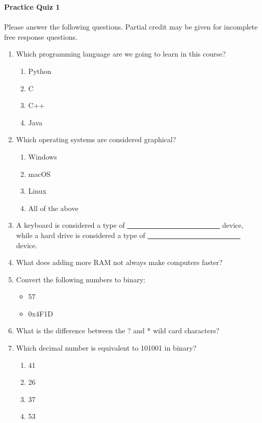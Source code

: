 \documentclass[letter,11pt]{article}
\begin{document}
\huge
\textbf{Practice Quiz 1}
\normalsize

\paragraph{}Please answer the following questions. Partial credit may be given for incomplete free response questions.

\begin{enumerate}
    \item Which programming language are we going to learn in this course?
    \begin{enumerate}
        \item Python
        \item C
        \item C++
        \item Java
    \end{enumerate}
    
    \item Which operating systems are considered graphical?
    \begin{enumerate}
        \item Windows
        \item macOS
        \item Linux
        \item All of the above
    \end{enumerate}
    
    \item A keyboard is considered a type of \underline{~~ ~~ ~~ ~~ ~~ ~~ ~~ ~~ ~~ ~~} device, while a hard drive is considered a type of \underline{~~ ~~ ~~ ~~ ~~ ~~ ~~ ~~ ~~ ~~} device.
    
    \item What does adding more RAM not always make computers faster?
    
    \item Convert the following numbers to binary:
    \begin{itemize}
        \item 57
        \item 0x4F1D
    \end{itemize}
    
    \item What is the difference between the ? and * wild card characters?
    
    \item Which decimal number is equivalent to 101001 in binary?
    \begin{enumerate}
        \item 41
        \item 26
        \item 37
        \item 53
    \end{enumerate}
    

\end{enumerate}
\end{document}
